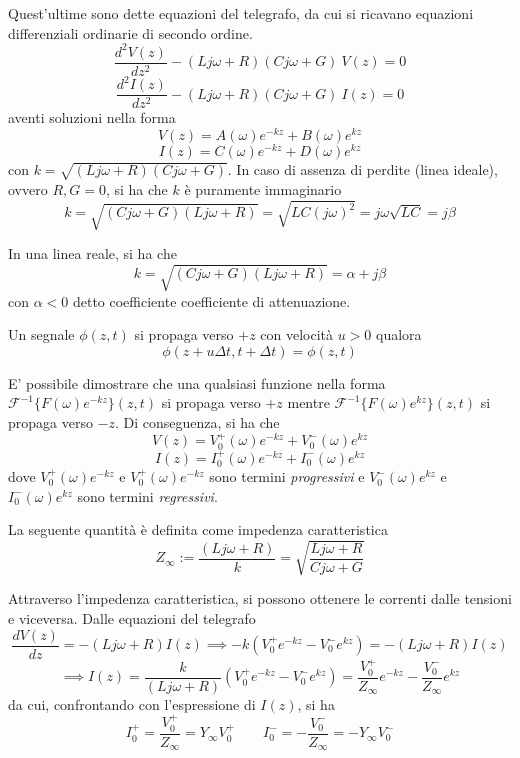     Quest'ultime sono dette equazioni del telegrafo, da cui si ricavano equazioni differenziali ordinarie di secondo ordine. 
    \[
        \frac{d^2 V(z)}{dz^2} - (L j \omega + R)(C j \omega + G) \: V(z) = 0
    \]
    \[
        \frac{d^2 I(z)}{dz^2} - (L j \omega + R)(C j \omega + G) \: I(z) = 0
    \]
    aventi soluzioni nella forma
    \[
        V(z) = A(\omega) e^{-k z} + B(\omega) e^{k z}
    \]
    \[
        I(z) = C(\omega) e^{-k z} + D(\omega) e^{k z}
    \]
    con $k = \sqrt{(L j \omega + R)(C j \omega + G)}$. In caso di assenza di perdite (linea ideale), ovvero $R, G = 0$, si ha che $k$ è puramente immaginario
    \[
        k = \sqrt{(C j \omega + G)(L j \omega + R)} =
        \sqrt{LC (j \omega)^2} =
        j \omega \sqrt{LC} =
        j \beta
    \]

    In una linea reale, si ha che
    \[
        k = \sqrt{(C j \omega + G)(L j \omega + R)} =
        \alpha + j \beta
    \]
    con $\alpha < 0$ detto coefficiente coefficiente di attenuazione.

    \begin{definition}
        Un segnale $\phi(z, t)$ si propaga verso $+z$ con velocità $u > 0$ qualora
        \[
           \phi(z + u \Delta t, t + \Delta t) = \phi(z, t)
        \]
    \end{definition}

    E' possibile dimostrare che una qualsiasi funzione nella forma $\mathcal{F}^{-1} \{F(\omega) e^{-k z}\}(z, t)$ si propaga verso $+z$ mentre $\mathcal{F}^{-1} \{F(\omega) e^{k z}\}(z, t)$ si propaga verso $-z$.
    Di conseguenza, si ha che
    \[
        V(z) = V^+_0(\omega) e^{-k z} + V^-_0(\omega) e^{k z}
    \]
    \[
        I(z) = I^+_0(\omega) e^{-k z} + I^-_0(\omega) e^{k z}
    \]
    dove $V^+_0(\omega) e^{-k z}$ e $V^+_0(\omega) e^{-k z}$ sono termini \textit{progressivi} e $V^-_0(\omega) e^{k z}$ e $I^-_0(\omega) e^{k z}$ sono termini \textit{regressivi}.

    \begin{definition}
        La seguente quantità è definita come impedenza caratteristica
        \[
            Z_{\infty} := \frac{(L j \omega + R)}{k} =
            \sqrt{\frac{L j \omega + R}{C j \omega + G}}
        \]
    \end{definition}

    Attraverso l'impedenza caratteristica, si possono ottenere le correnti dalle tensioni e viceversa. Dalle equazioni del telegrafo
    \[
        \frac{dV(z)}{dz} = -(L j \omega + R) I(z)
        \implies -k (V^+_0 e^{-k z} - V^-_0 e^{k z}) = -(L j \omega + R) I(z)
    \]
    \[
        \implies I(z) = \frac{k}{(L j \omega + R)} (V^+_0 e^{-k z} - V^-_0 e^{k z}) =
        \frac{V^+_0}{Z_\infty} e^{-k z} - \frac{V^-_0}{Z_\infty} e^{k z}
    \]
    da cui, confrontando con l'espressione di $I(z)$, si ha
    \[
        I^+_0 = \frac{V^+_0}{Z_\infty} = Y_\infty V^+_0 \qquad I^-_0 = -\frac{V^-_0}{Z_\infty} = -Y_\infty V^-_0
    \]

